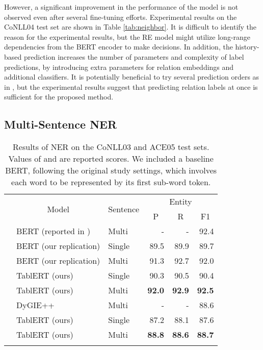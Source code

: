 \documentclass[11pt,a4paper]{article}
\begin{document}
However, a significant improvement in the performance of the model is not observed even after several fine-tuning efforts. Experimental results on the CoNLL04 test set are shown in Table \ref{tab:neighbor}. It is difficult to identify the reason for the experimental results, but the RE model might utilize long-range dependencies from the BERT encoder to make decisions.
In addition, the history-based prediction increases the number of parameters and complexity of label predictions, by introducing extra parameters for relation embeddings and additional classifiers. It is potentially beneficial to try several prediction orders as in \citet{miwa-sasaki-2014-modeling}, but the experimental results suggest that predicting relation labels at once is sufficient for the proposed method.


\subsection{Multi-Sentence NER}
\label{doclevel}



\begin{table*}[t]
    \centering
    \begin{tabular}{lllrrr}
    \Xhline{3\arrayrulewidth} 
    \multicolumn{1}{c}{\multirow{2}{*}{Dataset}} & \multicolumn{1}{c}{\multirow{2}{*}{Model}}  & \multicolumn{1}{c}{\multirow{2}{*}{Sentence}} & \multicolumn{3}{c}{Entity} \\
        \cline{4-6}
        & & & \multicolumn{1}{c}{P} & \multicolumn{1}{c}{R} & \multicolumn{1}{c}{F1} \\
    \Xhline{2\arrayrulewidth} 
        \multirow{5}{*}{CoNLL03} & BERT (reported in \citet{devlin-etal-2019-bert}) & Multi & - & - & 92.4\\
        & BERT (our replication) & Single & 89.5 & 89.9 &  89.7\\
        & BERT (our replication) & Multi & 91.3 & 92.7 & 92.0 \\
        \cline{2-6}
        & TablERT (ours) & Single & 90.3 & 90.5 & 90.4\\
        & TablERT (ours) & Multi & \textbf{92.0} & \textbf{92.9} & \textbf{92.5} \\
        \Xhline{2\arrayrulewidth} 
        \multirow{3}{*}{ACE05} & DyGIE++~\cite{Wadden2019EntityRA} & Multi & - & - & 88.6\\
        \cline{2-6}
        & TablERT (ours) & Single & 87.2 & 88.1 &  87.6\\
        & TablERT (ours) & Multi & \textbf{88.8} & \textbf{88.6} & \textbf{88.7} \\
    \Xhline{3\arrayrulewidth}
    \end{tabular}
    \caption{Results of NER on the CoNLL03 and ACE05 test sets. Values of \citet{devlin-etal-2019-bert} and \citet{Wadden2019EntityRA} are reported scores. We included a baseline BERT, following the original study settings, which involves each word to be represented by its first sub-word token.}
    \label{tab:ner}
\end{table*}
\end{document}

